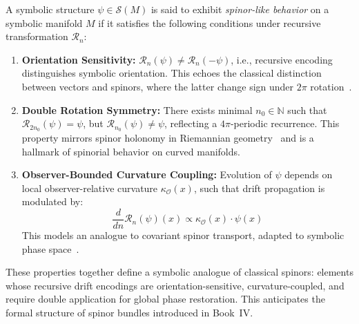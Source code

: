 \begin{definition}
\label{definition:bk1_spinor_like_structure}
A symbolic structure \( \psi \in \mathcal{S}(M) \) is said to exhibit \emph{spinor-like behavior} on a symbolic manifold \( M \) if it satisfies the following conditions under recursive transformation \( \mathcal{R}_n \):

\begin{enumerate}
    \item \textbf{Orientation Sensitivity:} \( \mathcal{R}_n(\psi) \neq \mathcal{R}_n(-\psi) \), i.e., recursive encoding distinguishes symbolic orientation. This echoes the classical distinction between vectors and spinors, where the latter change sign under \( 2\pi \) rotation~\cite{lawson_spin_geometry}.

    \item \textbf{Double Rotation Symmetry:} There exists minimal \( n_0 \in \mathbb{N} \) such that \( \mathcal{R}_{2n_0}(\psi) = \psi \), but \( \mathcal{R}_{n_0}(\psi) \neq \psi \), reflecting a \(4\pi\)-periodic recurrence. This property mirrors spinor holonomy in Riemannian geometry~\cite{friedrich_dirac} and is a hallmark of spinorial behavior on curved manifolds.

    \item \textbf{Observer-Bounded Curvature Coupling:} Evolution of \( \psi \) depends on local observer-relative curvature \( \kappa_{\mathcal{O}}(x) \), such that drift propagation is modulated by:
    \[
    \frac{d}{dn} \mathcal{R}_n(\psi)(x) \propto \kappa_{\mathcal{O}}(x) \cdot \psi(x)
    \]
    This models an analogue to covariant spinor transport, adapted to symbolic phase space~\cite{penrose_spinors,nash_sen}.
\end{enumerate}

These properties together define a symbolic analogue of classical spinors: elements whose recursive drift encodings are orientation-sensitive, curvature-coupled, and require double application for global phase restoration. This anticipates the formal structure of spinor bundles introduced in Book~IV.
\end{definition}
